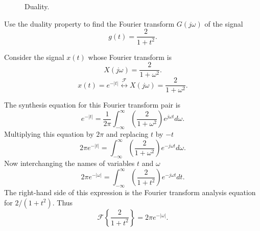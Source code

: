 \begin{frame}[plain]
{
        \begin{figure}
          \centering
          
          \caption{Duality.}\label{fi:diality}
        \end{figure}
}
\end{frame}


\begin{frame}[plain]
    \begin{example}
        Use the duality property to find the Fourier transform $G(j\omega)$ of the signal
        \begin{equation*}
            g(t) = \frac{2}{1+t^2}.
        \end{equation*}
    \end{example}
    \pause
    {
    Consider the signal $x(t)$ whose Fourier transform is
    \begin{equation*}
        X(j\omega) =  \frac{2}{1+\omega^2}.
    \end{equation*}
    \begin{equation*}
        x(t) = e^{-|t|} \overset{\mathcal{F}}{\longleftrightarrow}  X(j\omega) =  \frac{2}{1+\omega^2}.
    \end{equation*}
    }
\end{frame}


\begin{frame}[plain]
    {
    The synthesis equation for this Fourier transform pair is \pause
    \begin{equation*}
        e^{-|t|} = \frac{1}{2\pi}\int_{-\infty}^{\infty}\left(\frac{2}{1+\omega^2}\right)e^{j\omega t}d\omega.
    \end{equation*}
    \pause
    Multiplying this equation by $2\pi$ and replacing $t$ by $-t$\pause
    \begin{equation*}
        2\pi e^{-|t|} = \int_{-\infty}^{\infty}\left(\frac{2}{1+\omega^2}\right)e^{-j\omega t}d\omega.
    \end{equation*}
    \pause
    Now interchanging the names of variables $t$ and $\omega$\pause
    \begin{equation*}
        2\pi e^{-|\omega|} = \int_{-\infty}^{\infty}\left(\frac{2}{1+t^2}\right)e^{-j\omega t}dt.
    \end{equation*}
    \pause
    The right-hand side of this expression is the Fourier transform analysis equation for $2/(1+t^2)$.   Thus
    \begin{equation*}
        \mathcal{F}\left\{ \frac{2}{1+t^2}\right\} =  2\pi e^{-|\omega|}.
    \end{equation*}
    }
\end{frame}

